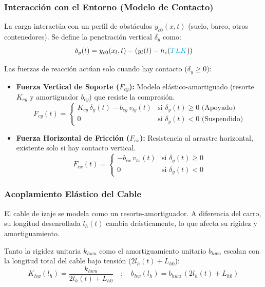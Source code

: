 \documentclass[11pt]{article}                                    %
\begin{document}
\subsubsection*{Interacción con el Entorno (Modelo de Contacto)}
La carga interactúa con un perfil de obstáculos $y_{c0}(x,t)$ (suelo, barco, otros contenedores). Se define la penetración vertical $\delta_y$ como:
\[ \delta_y(t) = y_{c0}(x_l,t) - (y_l(t) - h_c(\textcolor{cyan}{TLK})) \]

Las fuerzas de reacción actúan solo cuando hay contacto ($\delta_y \ge 0$):
\begin{itemize}
    \item \textbf{Fuerza Vertical de Soporte ($F_{cy}$):} Modelo elástico-amortiguado (resorte $K_{cy}$ y amortiguador $b_{cy}$) que resiste la compresión.
    \begin{equation}
        F_{cy}(t) = 
        \begin{cases} 
            K_{cy} \, \delta_y(t) - b_{cy} \, v_{ly}(t) & \text{si } \delta_y(t) \ge 0 \text{ (Apoyado)} \\
            0 & \text{si } \delta_y(t) < 0 \text{ (Suspendido)}
        \end{cases}
    \end{equation}

    \item \textbf{Fuerza Horizontal de Fricción ($F_{cx}$):} Resistencia al arrastre horizontal, existente solo si hay contacto vertical.
    \begin{equation}
        F_{cx}(t) = 
        \begin{cases} 
            -b_{cx} \, v_{lx}(t) & \text{si } \delta_y(t) \ge 0 \\
            0 & \text{si } \delta_y(t) < 0
        \end{cases}
    \end{equation}
\end{itemize}

\subsubsection{Acoplamiento Elástico del Cable}
El cable de izaje se modela como un resorte-amortiguador. A diferencia del carro, su longitud desenrollada $l_h(t)$ cambia drásticamente, lo que afecta su rigidez y amortiguamiento.

Tanto la rigidez unitaria $k_{hwu}$ como el amortiguamiento unitario $b_{hwu}$ escalan con la longitud total del cable bajo tensión ($2 l_h(t) + L_{h0}$):
\begin{equation}
    K_{hw}(l_h) = \frac{k_{hwu}}{2 l_h(t) + L_{h0}} \quad ; \quad b_{hw}(l_h) = b_{hwu}\,(2 l_h(t) + L_{h0})
\end{equation}
\end{document}
